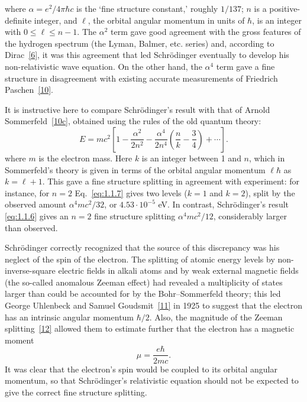 where $\alpha=e^2/4\pi\hbar c$ is the `fine structure constant,' roughly $1/137$; $n$ is a
positive-definite integer, and $\ell$, the orbital angular momentum in units of
$\hbar$, is an integer with $0\leq\ell\leq n-1$. The $\alpha^2$ term gave good agreement
with the gross features of the hydrogen spectrum (the Lyman, Balmer,
etc. series) and, according to Dirac~\hyperref[ref:1.6]{[6]}, it was this agreement that led
Schr\"odinger eventually to develop his non-relativistic wave equation. On
the other hand, the $\alpha^4$ term gave a fine structure in disagreement with
existing accurate measurements of Friedrich Paschen~\hyperref[ref:1.10]{[10]}.

It is instructive here to compare Schr\"odinger's result with that of Arnold
Sommerfeld~\hyperref[ref:1.10c]{[10c]}, obtained using the rules of the old quantum theory:
\begin{equation}
  E=mc^2\left[1-\frac{\alpha^2}{2n^2}
  -\frac{\alpha^4}{2n^4}\left(\frac{n}{k}-\frac34\right)
  +\cdots\right].
  \tag{1.1.7}\label{eq:1.1.7}
\end{equation}
where $m$ is the electron mass. Here $k$ is an integer between 1 and $n$, which
in Sommerfeld's theory is given in terms of the orbital angular momentum
$\ell\hbar$ as $k=\ell+1$. This gave a fine structure splitting in agreement with
experiment: for instance, for $n=2$ Eq.~\eqref{eq:1.1.7} gives two levels ($k=1$
and $k=2$), split by the observed amount $\alpha^4mc^2/32$, or $4.53\cdot10^{-5}$ eV. In
contrast, Schr\"odinger's result \eqref{eq:1.1.6} gives an $n=2$ fine structure splitting
$\alpha^4mc^2/12$, considerably larger than observed.

Schr\"odinger correctly recognized that the source of this discrepancy
was his neglect of the spin of the electron. The splitting of atomic
energy levels by non-inverse-square electric fields in alkali atoms and by
weak external magnetic fields (the so-called anomalous Zeeman effect)
had revealed a multiplicity of states larger than could be accounted for
by the Bohr--Sommerfeld theory; this led George Uhlenbeck and Samuel
Goudsmit~\hyperref[ref:1.11]{[11]} in 1925 to suggest that the electron has an intrinsic angular
momentum $\hbar/2$. Also, the magnitude of the Zeeman splitting~\hyperref[ref:1.12]{[12]} allowed
them to estimate further that the electron has a magnetic moment
\begin{equation}
  \mu=\frac{e\hbar}{2mc}.
  \tag{1.1.8}\label{eq:1.1.8}
\end{equation}
It was clear that the electron's spin would be coupled to its orbital
angular momentum, so that Schr\"odinger's relativistic equation should not
be expected to give the correct fine structure splitting.

